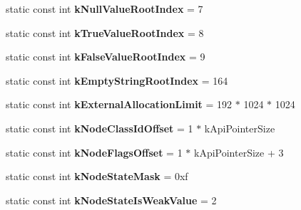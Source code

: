 \begin{DoxyCompactItemize}
\item 
\hypertarget{classv8_1_1internal_1_1_internals_ab311cf753ec5c968052bd83ef21e83f8}{}static const int {\bfseries k\+Null\+Value\+Root\+Index} = 7\label{classv8_1_1internal_1_1_internals_ab311cf753ec5c968052bd83ef21e83f8}

\item 
\hypertarget{classv8_1_1internal_1_1_internals_a93abd58b178eca469bade28e68b5c59e}{}static const int {\bfseries k\+True\+Value\+Root\+Index} = 8\label{classv8_1_1internal_1_1_internals_a93abd58b178eca469bade28e68b5c59e}

\item 
\hypertarget{classv8_1_1internal_1_1_internals_a90b6837aa368bbe4ffd914e6f753b167}{}static const int {\bfseries k\+False\+Value\+Root\+Index} = 9\label{classv8_1_1internal_1_1_internals_a90b6837aa368bbe4ffd914e6f753b167}

\item 
\hypertarget{classv8_1_1internal_1_1_internals_a6f669f3d98fe653b281b26be3bc0655a}{}static const int {\bfseries k\+Empty\+String\+Root\+Index} = 164\label{classv8_1_1internal_1_1_internals_a6f669f3d98fe653b281b26be3bc0655a}

\item 
\hypertarget{classv8_1_1internal_1_1_internals_aa88e5a295f86584aa3e90ebc1a6c4739}{}static const int {\bfseries k\+External\+Allocation\+Limit} = 192 $\ast$ 1024 $\ast$ 1024\label{classv8_1_1internal_1_1_internals_aa88e5a295f86584aa3e90ebc1a6c4739}

\item 
\hypertarget{classv8_1_1internal_1_1_internals_af4fb6d499cb87f03031ad4d6be6bcd8f}{}static const int {\bfseries k\+Node\+Class\+Id\+Offset} = 1 $\ast$ k\+Api\+Pointer\+Size\label{classv8_1_1internal_1_1_internals_af4fb6d499cb87f03031ad4d6be6bcd8f}

\item 
\hypertarget{classv8_1_1internal_1_1_internals_aee5606f2a44d43d8dafe344e0bb753ef}{}static const int {\bfseries k\+Node\+Flags\+Offset} = 1 $\ast$ k\+Api\+Pointer\+Size + 3\label{classv8_1_1internal_1_1_internals_aee5606f2a44d43d8dafe344e0bb753ef}

\item 
\hypertarget{classv8_1_1internal_1_1_internals_a853acc088978d38a5a69091cf857a46d}{}static const int {\bfseries k\+Node\+State\+Mask} = 0xf\label{classv8_1_1internal_1_1_internals_a853acc088978d38a5a69091cf857a46d}

\item 
\hypertarget{classv8_1_1internal_1_1_internals_a8a5d4cc92a6952c2a50922c77a606e68}{}static const int {\bfseries k\+Node\+State\+Is\+Weak\+Value} = 2\label{classv8_1_1internal_1_1_internals_a8a5d4cc92a6952c2a50922c77a606e68}


\end{DoxyCompactItemize}
